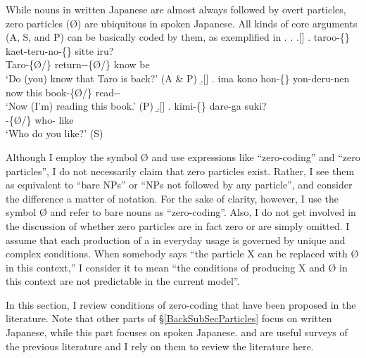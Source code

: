 While nouns in written Japanese are almost always followed by overt particles,
zero particles ({\O}) are ubiquitous in spoken Japanese.
All kinds of core arguments (A, S, and P) can be basically coded by them, as exemplified in \Next.
%
\ex. \a.[] 
	\bg. {taroo-\{\}} {kaet-teru-no-\{\}} sitte iru? \\
		Taro-\{{\O}/\} return--\{{\O}/\} know be \\
		`Do (you) know that Taro is back?' \hfill{(A \& P)}
	\b.[] 
	\bg. ima kono {hon-\{\}} yon-deru-nen \\
		now this book-\{{\O}/\} read-- \\
		`Now (I'm) reading this book.' \hfill{(P)}
	\b.[] 
	\bg. {kimi-\{\}} dare-ga suki? \\
		-\{{\O}/\} who- like \\
		`Who do you like?' \hfill{(S)}
		\begin{flushright}
		{\cite[pp.\ 367-368, glosses modified]{shibatani90}}
		\end{flushright}

Although I employ the symbol {\O} and
use expressions like ``zero-coding'' and ``zero particles'',
I do not necessarily claim that zero particles exist. Rather, I see them as equivalent to ``bare NPs'' or ``NPs not followed by any particle'', and consider the difference a matter of notation.
For the sake of clarity, however,
I use the symbol {\O} and refer to bare nouns as ``zero-coding''.
Also, I do not get involved in the discussion of whether
zero particles are in fact zero or are simply omitted.
I assume that each production of a  in everyday usage is governed by unique and complex conditions.
When somebody says ``the particle X can be replaced with {\O} in this context,''
I consider it to mean ``the conditions of producing X and {\O} in this context are not predictable in the current model''.

In this section, I review conditions of zero-coding that have been proposed in the literature.
Note that other parts of \S \ref{BackSubSecParticles}
focus on written Japanese,
while this part focuses on spoken Japanese.
 and  are useful surveys of the previous literature and
I rely on them to review the literature here.

